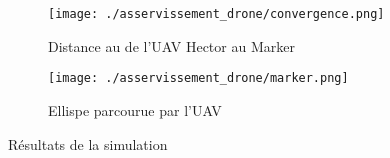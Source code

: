 \begin{figure}[!htb]
    \centering
    \begin{subfigure}[b]{0.4\textwidth}
        \centering
        \texttt{[image: ./asservissement\_drone/convergence.png]}
        \caption{Distance au de l'UAV Hector au Marker}
        \label{fig:convergence}
    \end{subfigure}
    \hfill
    \begin{subfigure}[b]{0.5\textwidth}
        \centering
        \texttt{[image: ./asservissement\_drone/marker.png]}
        \caption{Ellispe parcourue par l'UAV}
        \label{fig:manifold}
    \end{subfigure}
    \caption{Résultats de la simulation}
    \label{fig:ellipse}
\end{figure}